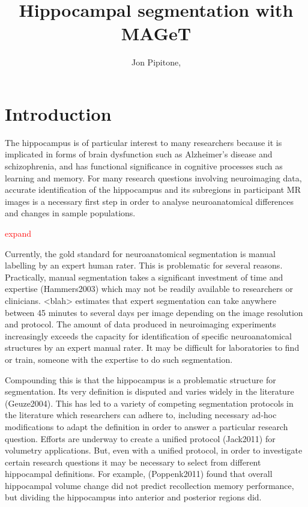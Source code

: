 \documentclass{article}\usepackage{graphicx, color}
\newcommand{\todo}[1]{
    \addcontentsline{tdo}{todo}{\protect{#1}}
    \textcolor{red}{#1}
}
\begin{document}
\title{Hippocampal segmentation with MAGeT}
\author{Jon Pipitone, }
\maketitle

\section{Introduction}

The hippocampus is of particular interest to many researchers because it is implicated in forms of brain dysfunction such as Alzheimer's disease and schizophrenia, and has functional significance in cognitive processes such as learning and memory.  For many research questions involving neuroimaging data, accurate identification of the hippocampus and its subregions in participant MR images is a necessary first step in order to analyse neuroanatomical differences and changes in  sample populations.  \todo{expand}

Currently, the gold standard for neuroanatomical segmentation is manual labelling by an expert human rater.  This is problematic for several reasons.  Practically, manual segmentation takes a significant investment of time and expertise (Hammers2003) which may not be readily available to researchers or clinicians.  <blah> estimates that expert segmentation can take anywhere between 45 minutes to several days per image depending on the image resolution and protocol.  The amount of data produced in neuroimaging experiments increasingly exceeds the capacity for identification of specific neuroanatomical structures by an expert manual rater.  It may be difficult for laboratories to find or train, someone with the expertise to do such segmentation.  

Compounding this is that the hippocampus is a problematic structure for segmentation. Its very definition is disputed and varies widely in the literature (Geuze2004).  This has led to a variety of competing segmentation protocols in the literature which researchers can adhere to, including necessary ad-hoc modifications to adapt the definition in order to answer a particular research question.  Efforts are underway to create a unified protocol (Jack2011) for volumetry applications. But, even with a unified protocol, in order to investigate certain research questions it may be necessary to select from different hippocampal definitions. For example, (Poppenk2011) found that overall hippocampal volume change did not predict recollection memory performance, but dividing the hippocampus into anterior and posterior regions did. 
\end{document}
